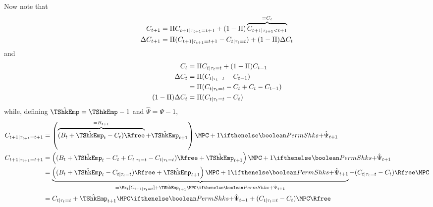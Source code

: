 \documentclass{handout}
\begin{document}
Now note that 
\begin{equation}\begin{gathered}\begin{aligned}
          C_{t+1} & =  \Pi C_{t+1|\tau_{t+1}=t+1} + (1-\Pi) \overbrace{C_{t+1|\tau_{t+1}<t+1}}^{=C_{t}}
\\ \Delta C_{t+1} & =  \Pi (C_{t+1|\tau_{t+1}=t+1}-C_{t|\tau_{t}=t}) + (1-\Pi) \Delta C_{t} \label{eq:DCtp1}
\end{aligned}\end{gathered}\end{equation}
and 
\begin{equation}\begin{gathered}\begin{aligned}
          C_{t} & =  \Pi C_{t|\tau_{t}=t} + (1-\Pi) C_{t-1}
\\ \Delta C_{t} & =  \Pi (C_{t|\tau_{t}=t}-C_{t-1}) 
\\  & =  \Pi (C_{t|\tau_{t}=t}-C_{t}+C_{t}-C_{t-1})
\\ (1-\Pi) \Delta C_{t} & =  \Pi (C_{t|\tau_{t}=t}-C_{t}) \label{eq:DCvsCmC}
\end{aligned}\end{gathered}\end{equation}
while, defining $\hat{\TShkEmp}=\TShkEmp-1$ and $\hat{\Psi}=\Psi-1$,
\begin{equation}\begin{gathered}\begin{aligned}
  \CLev_{t+1|\tau_{t+1}=t+1} & =  \left(\overbrace{(\BLev_{t}+\hat{\TShkEmp}_{t}-\CLev_{t})\Rfree}^{=\BLev_{t+1}}+\hat{\TShkEmp}_{t+1}\right)\MPC+1\ifPerm{+\hat{\Psi}_{t+1}}{}
\\  \CLev_{t+1|\tau_{t+1}=t+1} & =  \left((\BLev_{t}+\hat{\TShkEmp}_{t}-\CLev_{t}+\CLev_{t|\tau_{t}=t}-\CLev_{t|\tau_{t}=t})\Rfree+\hat{\TShkEmp}_{t+1}\right)\MPC+1\ifPerm{+\hat{\Psi}_{t+1}}{}
\\ & =  \underbrace{\left((\BLev_{t}+\hat{\TShkEmp}_{t}-\CLev_{t|\tau_{t}=t})\Rfree+\hat{\TShkEmp}_{t+1}\right)\MPC+1\ifPerm{+\hat{\Psi}_{t+1}}{}}_{=\Ex_{t}[\CLev_{t+1|\tau_{t}=t}]+\hat{\TShkEmp}_{t+1}\MPC\ifPerm{+\hat{\Psi}_{t+1}}{}}+(\CLev_{t|\tau_{t}=t}-\CLev_{t})\Rfree\MPC \nonumber
\\ & =  \CLev_{t|\tau_{t}=t}+\hat{\TShkEmp}_{t+1}\MPC\ifPerm{+\hat{\Psi}_{t+1}}{}+(\CLev_{t|\tau_{t}=t}-\CLev_{t})\MPC \Rfree \label{eq:DCtp1Gtp1}
\end{aligned}\end{gathered}\end{equation}
\end{document}
